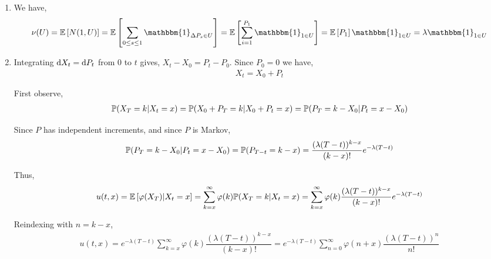 \documentclass[10pt]{article}
\begin{document}
\begin{solution}[Solution]
\begin{enumerate}[label=(\alph*)]
    \item 
        We have,
        \begin{align*}
            \nu(U) = \EE \left[ N(1,U) \right] 
            = \EE \left[ \sum_{0\leq s\leq 1} \mathbbm{1}_{\Delta P_s \in U} \right]
            = \EE \left[ \sum_{i=1}^{P_1} \mathbbm{1}_{1\in U} \right]
            = \EE \left[ P_1 \right] \mathbbm{1}_{1\in U}
            = \lambda \mathbbm{1}_{1\in U}
        \end{align*}
       

    \item Integrating \( \mathrm{d} X_t = \mathrm{d} P_t \) from \( 0 \) to \( t \) gives, \( X_t - X_0 = P_t - P_0 \). Since \( P_0 = 0 \) we have,
        \begin{align*}
            X_t = X_0 + P_t
        \end{align*}

        First observe,
        \begin{align*}
            \mathbb{P} (X_T = k | X_t = x)
            =\mathbb{P} (X_0 + P_T = k | X_0 + P_t = x)
            =\mathbb{P} (P_T = k - X_0 | P_t = x - X_0)
        \end{align*}
    
        Since \( P \) has independent increments, and since \( P \) is Markov,
        \begin{align*}
            \mathbb{P} (P_T = k - X_0 | P_t = x - X_0)
            =\mathbb{P} (P_{T-t} = k - x)
            = \dfrac{(\lambda(T-t))^{k-x}}{(k-x)!}e^{-\lambda (T-t)}
        \end{align*} 
        
        Thus,
        \begin{align*}
            u(t,x) = \mathbb{E} \left[ \varphi(X_T) | X_t = x \right]
            = \sum_{k=x}^{\infty} \varphi(k) \mathbb{P} (X_T = k | X_t = x)
            = \sum_{k=x}^{\infty} \varphi(k) \dfrac{(\lambda(T-t))^{k-x}}{(k-x)!}e^{-\lambda (T-t)}
        \end{align*}
        
        Reindexing with \( n= k-x \),
        \begin{align*}
            u(t,x)  
            = e^{-\lambda (T-t)} \sum_{k=x}^{\infty} \varphi(k) \dfrac{(\lambda(T-t))^{k-x}}{(k-x)!}
            = e^{-\lambda (T-t)} \sum_{n=0}^{\infty} \varphi(n+x) \dfrac{(\lambda(T-t))^{n}}{n!}
        \end{align*}
        


\end{enumerate}
\end{solution}
\end{document}
